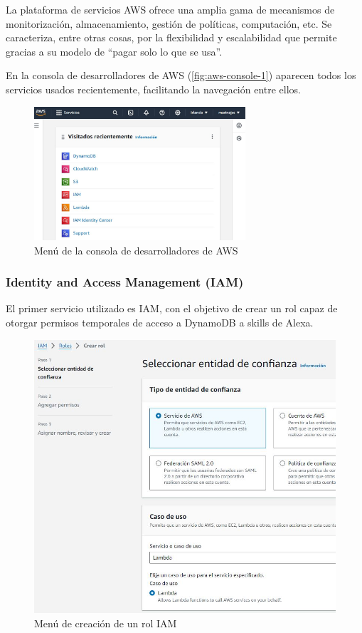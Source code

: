 La plataforma de servicios AWS ofrece una amplia gama de mecanismos de monitorización, almacenamiento, gestión de políticas, computación, etc. Se caracteriza, entre otras cosas, por la flexibilidad y escalabilidad que permite gracias a su modelo de \enquote{pagar solo lo que se usa}.

En la consola de desarrolladores de AWS (\autoref{fig:aws-console-1}) aparecen todos los servicios usados recientemente, facilitando la navegación entre ellos.

\begin{figure}[H]
	\centering
	\includegraphics[width=0.7\textwidth]{imgs/aws-console-1.jpg}
	\caption{Menú de la consola de desarrolladores de AWS}
	\label{fig:aws-console-1}
\end{figure}


\subsubsection{Identity and Access Management (IAM)}

El primer servicio utilizado es IAM, con el objetivo de crear un rol capaz de otorgar permisos temporales de acceso a DynamoDB a skills de Alexa.

\begin{figure}[H]
	\centering
	\includegraphics[width=1\textwidth]{imgs/aws-iam-2.jpg}
	\caption{Menú de creación de un rol IAM}
	\label{fig:aws-iam-2}
\end{figure}

